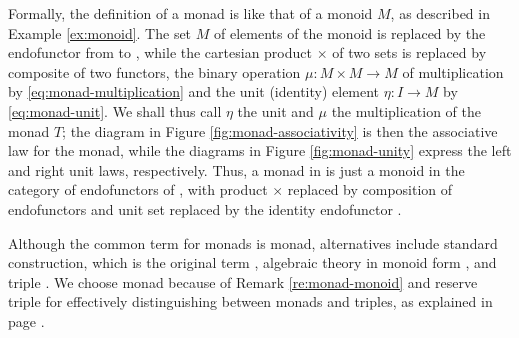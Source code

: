 \begin{remark}
  \label{re:monad-monoid}

  Formally, the definition of a monad is like that of a monoid $M$, as
  described in Example \ref{ex:monoid}. The set $M$ of
  elements of the monoid is replaced by the endofunctor  from
   to , while the cartesian product $\times$ of two sets
  is replaced by composite of two functors, the binary operation $\mu:
  M \times M \to M$ of multiplication by
  \eqref{eq:monad-multiplication} and the unit (identity) element
  $\eta: I \to M$ by \eqref{eq:monad-unit}. We shall thus call $\eta$
  the unit and $\mu$ the multiplication of the monad $T$; the diagram
  in Figure \ref{fig:monad-associativity} is then the associative law
  for the monad, while the diagrams in Figure \ref{fig:monad-unity}
  express the left and right unit laws, respectively. Thus, a monad in
   is just a monoid in the category of endofunctors of ,
  with product $\times$ replaced by composition of endofunctors and
  unit set replaced by the identity endofunctor
  \parencite[138]{maclane-1998}.

\end{remark}


\begin{terminology}
  \label{ter:monad}

  Although the common term for monads is monad, alternatives
  include standard construction, which is the original term
  \parencite[30]{manes-1976}, algebraic theory in monoid form
  \parencite[29]{manes-1976}, and triple
  \parencites[83]{barr-2005}[372]{barr-wells-2012}.
  We choose monad because of Remark
  \ref{re:monad-monoid} and reserve triple for effectively
  distinguishing between monads and triples, as explained in page
  \pageref{ter:triple}.

\end{terminology}

